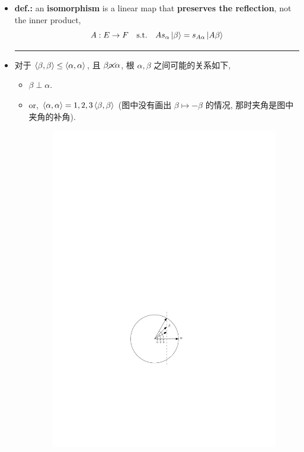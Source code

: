 \begin{itemize}
	\item \textbf{def.:} an \textbf{isomorphism} is a linear map that \textbf{preserves the reflection}, not the inner product,
	\begin{equation}
		A : E \rightarrow F \quad \text{s.t.} \quad A s_\alpha \ket{\beta} = s_{A \alpha} \ket{A \beta}
	\end{equation}
	
	\noindent\rule[0.5ex]{\linewidth}{0.5pt} %
	
	\item 对于 $\braket{\beta, \beta} \leq \braket{\alpha, \alpha}$, 且 $\beta \cancel{\propto} \alpha$, 根 $\alpha, \beta$ 之间可能的关系如下,
	\begin{itemize}
		\item $\beta \perp \alpha$.
		
		\item or, $\braket{\alpha, \alpha} = 1, 2, 3 \braket{\beta, \beta}$ (图中没有画出 $\beta \mapsto - \beta$ 的情况, 那时夹角是图中夹角的补角).
		
		\begin{figure}[H]
			\centering
			\includegraphics[scale=1]{figures/the basic acute angles and length ratios.pdf}
		\end{figure}
	\end{itemize}
	

\end{itemize}
